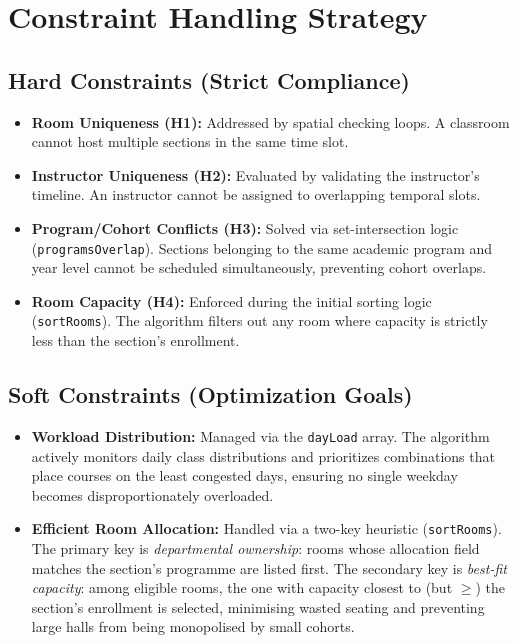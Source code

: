\documentclass[12pt, a4paper]{article}
\begin{document}
\section{Constraint Handling Strategy}

\subsection{Hard Constraints (Strict Compliance)}

\begin{itemize}[noitemsep, topsep=4pt]
    \item \textbf{Room Uniqueness (H1):} Addressed by spatial checking loops. A
          classroom cannot host multiple sections in the same time slot.

    \item \textbf{Instructor Uniqueness (H2):} Evaluated by validating the instructor's
          timeline. An instructor cannot be assigned to overlapping temporal slots.

    \item \textbf{Program/Cohort Conflicts (H3):} Solved via set-intersection logic
          (\texttt{programsOverlap}). Sections belonging to the same academic program
          and year level cannot be scheduled simultaneously, preventing cohort overlaps.

    \item \textbf{Room Capacity (H4):} Enforced during the initial sorting logic
          (\texttt{sortRooms}). The algorithm filters out any room where capacity is
          strictly less than the section's enrollment.
\end{itemize}

\subsection{Soft Constraints (Optimization Goals)}

\begin{itemize}[noitemsep, topsep=4pt]
    \item \textbf{Workload Distribution:} Managed via the \texttt{dayLoad} array. The
          algorithm actively monitors daily class distributions and prioritizes
          combinations that place courses on the least congested days, ensuring
          no single weekday becomes disproportionately overloaded.

    \item \textbf{Efficient Room Allocation:} Handled via a two-key heuristic
          (\texttt{sortRooms}). The primary key is \textit{departmental ownership}:
          rooms whose allocation field matches the section's programme are listed
          first. The secondary key is \textit{best-fit capacity}: among eligible rooms,
          the one with capacity closest to (but $\geq$) the section's enrollment is
          selected, minimising wasted seating and preventing large halls from being
          monopolised by small cohorts.
\end{itemize}
\end{document}
